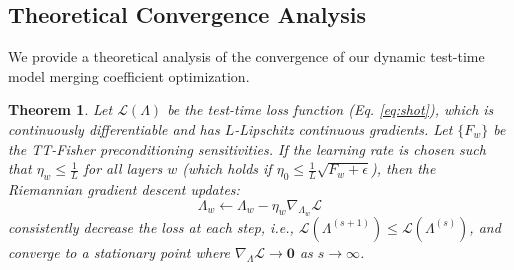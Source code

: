 \documentclass{article}
\theoremstyle{plain}
\newtheorem{theorem}{Theorem}[section]
\theoremstyle{definition}
\theoremstyle{remark}
\begin{document}
\subsection{Theoretical Convergence Analysis}
We provide a theoretical analysis of the convergence of our dynamic test-time model merging coefficient optimization. 

\begin{theorem}
\label{thm:convergence}
Let $\mathcal{L}(\Lambda)$ be the test-time loss function (Eq. \ref{eq:shot}), which is continuously differentiable and has $L$-Lipschitz continuous gradients. Let $\{F_w\}$ be the TT-Fisher preconditioning sensitivities. If the learning rate is chosen such that $\eta_w \le \frac{1}{L}$ for all layers $w$ (which holds if $\eta_0 \le \frac{1}{L} \sqrt{F_w + \epsilon}$), then the Riemannian gradient descent updates:
\begin{equation}
    \Lambda_w \leftarrow \Lambda_w - \eta_w \nabla_{\Lambda_w} \mathcal{L}
\end{equation}
consistently decrease the loss at each step, i.e., $\mathcal{L}(\Lambda^{(s+1)}) \le \mathcal{L}(\Lambda^{(s)})$, and converge to a stationary point where $\nabla_{\Lambda} \mathcal{L} \rightarrow \mathbf{0}$ as $s \rightarrow \infty$.
\end{theorem}
\end{document}
